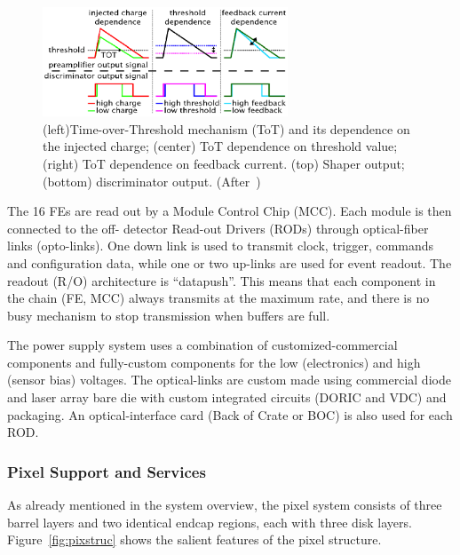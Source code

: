 \begin{figure}[!htbp]
\centering
\includegraphics[width=0.65\textwidth]{tot.png}
\caption{\label{fig:tot} (left)Time-over-Threshold mechanism (ToT) and its dependence on the injected charge; (center) ToT dependence on threshold value; (right) ToT dependence on feedback current.
 (top) Shaper output; (bottom) discriminator output. (After~\cite{AtlasVertexing2009})}
\end{figure}

The 16 FEs are read out by a Module Control Chip (MCC). Each module is then connected to the off-
detector Read-out Drivers (RODs) through optical-fiber links (opto-links).
One down link is used to transmit
clock, trigger, commands and configuration data, while one or two up-links are used for event
readout.
The readout (R/O) architecture is ``datapush''.
This means that each component in the chain (FE, MCC) always transmits at the maximum
rate, and there is no busy mechanism to stop transmission when buffers are full. 

The power supply system uses a combination of customized-commercial components and
fully-custom components for the low (electronics) and high (sensor bias) voltages.
The optical-links are custom made using commercial diode and laser array bare die with custom integrated circuits (DORIC and VDC) and packaging. An optical-interface card (Back of Crate or BOC) is also used for each ROD.

\subsubsection{Pixel Support and Services}
\label{sec:pixelservices}

As already mentioned in the system overview, the pixel system consists of three barrel layers and two identical endcap regions, each with three disk layers. Figure~\ref{fig:pixstruc} shows the salient 
features of the pixel structure.

